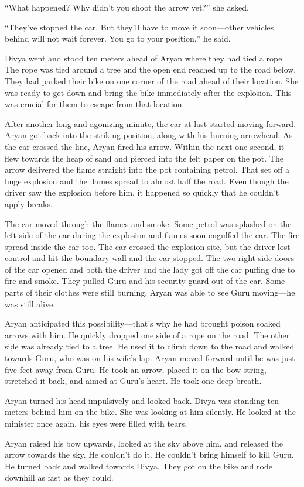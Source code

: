 “What happened? Why didn't you shoot the arrow yet?” she asked.

“They've stopped the car. But they'll have to move it soon—other vehicles
behind will not wait forever. You go to your position,” he said.

Divya went and stood ten meters ahead of Aryan where they had tied a rope. The
rope was tied around a tree and the open end reached up to the road below. They
had parked their bike on one corner of the road ahead of their location. She was
ready to get down and bring the bike immediately after the explosion. This was
crucial for them to escape from that location.

After another long and agonizing minute, the car at last started moving forward.
Aryan got back into the striking position, along with his burning arrowhead. As the
car crossed the line, Aryan fired his arrow. Within the next one second, it flew
towards the heap of sand and pierced into the felt paper on the pot. The arrow
delivered the flame straight into the pot containing petrol. That set off a
huge explosion and the flames spread to almost half the road. Even though the
driver saw the explosion before him, it happened so quickly that he couldn't
apply breaks.

The car moved through the flames and smoke. Some petrol was splashed
on the left side of the car during the explosion and flames soon engulfed the
car. The fire spread inside the car too. The car crossed the explosion site, but
the driver lost control and hit the boundary wall and the car stopped. The two
right side doors of the car opened and both the driver and the lady got off the
car puffing due to fire and smoke. They pulled Guru and his security guard out
of the car. Some parts of their clothes were still burning. Aryan was able to
see Guru moving—he was still alive.

Aryan anticipated this possibility—that's why he had brought poison soaked
arrows with him. He quickly dropped one side of a rope on the road. The other
side was already tied to a tree. He used it to climb down to the road and walked
towards Guru, who was on his wife's lap. Aryan moved forward until he was just
five feet away from Guru. He took an arrow, placed it on the bow-string,
stretched it back, and aimed at Guru's heart. He took one deep breath.

Aryan turned his head impulsively and looked back. Divya was standing ten meters
behind him on the bike. She was looking at him silently. He looked at the
minister once again, his eyes were filled with tears.

Aryan raised his bow upwards, looked at the sky above him, and released the
arrow towards the sky. He couldn't do it. He couldn't bring himself to kill
Guru. He turned back and walked towards Divya. They got on the bike and rode
downhill as fast as they could.
